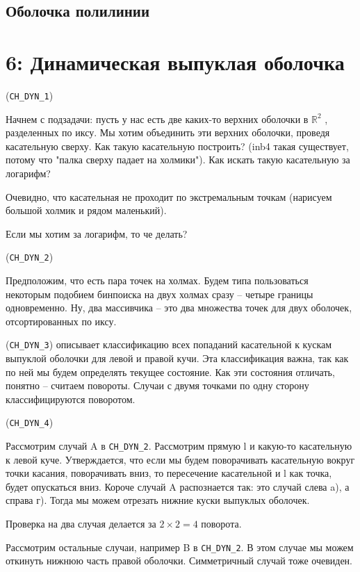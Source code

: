 \documentclass[11pt]{article}
\begin{document}
\subsection{{\bfseries{}} Оболочка полилинии}
\label{sec:orgheadline28}
\section{{\bfseries{}} 6:  Динамическая выпуклая оболочка}
\label{sec:orgheadline30}
(\texttt{CH\_DYN\_1})

Начнем с подзадачи: пусть у нас есть две каких-то верхних оболочки в
\(\mathbb{R}^2\) , разделенных по иксу. Мы хотим объединить эти верхних оболочки,
проведя касательную сверху. Как такую касательную построить? (inb4
такая существует, потому что "палка сверху падает на холмики"). Как
искать такую касательную за логарифм?

Очевидно, что касательная не проходит по экстремальным точкам
(нарисуем большой холмик и рядом маленький).

Если мы хотим за логарифм, то че делать?

(\texttt{CH\_DYN\_2})

Предположим, что есть пара точек на холмах. Будем типа пользоваться
некоторым подобием бинпоиска на двух холмах сразу -- четыре границы
одновременно. Ну, два массивчика -- это два множества точек для двух
оболочек, отсортированных по иксу.

(\texttt{CH\_DYN\_3}) описывает классификацию всех попаданий касательной к кускам
выпуклой оболочки для левой и правой кучи. Эта классификация важна,
так как по ней мы будем определять текущее состояние. Как эти
состояния отличать, понятно -- считаем повороты. Случаи с двумя
точками по одну сторону классифицируются поворотом.

(\texttt{CH\_DYN\_4})

Рассмотрим случай A в \texttt{CH\_DYN\_2}. Рассмотрим прямую l и какую-то
касательную к левой куче. Утверждается, что если мы будем
поворачивать касательную вокруг точки касания, поворачивать вниз, то
пересечение касательной и l как точка, будет опускаться вниз.
Короче случай A распознается так: это случай слева a), а справа
г). Тогда мы можем отрезать нижние куски выпуклых оболочек.

Проверка на два случая делается за \(2\times2 = 4\) поворота.

Рассмотрим остальные случаи, например B в \texttt{CH\_DYN\_2}. В этом случае мы
можем откинуть нижнюю часть правой оболочки. Симметричный случай
тоже очевиден.
\end{document}
